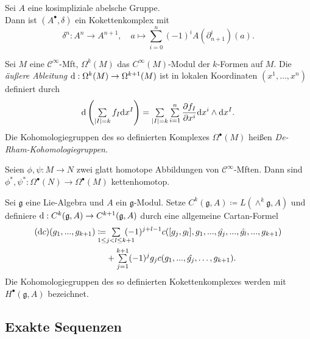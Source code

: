 \documentclass{cheat-sheet}
\newcommand{\nspace}[1]{\foreach \i in {1,...,#1}{ \! }} %
\newcommand{\Lg}{\mathfrak{g}} %
\newcommand{\Cont}{\mathcal{C}} %
\begin{document}
\begin{defn}
  Sei $A$ eine kosimpliziale abelsche Gruppe. \\
  Dann ist $(A^\bullet, \delta)$ ein Kokettenkomplex mit
  \[
    \delta^n : A^n \to A^{n+1}, \quad
    a \mapsto \sum_{i=0}^n (-1)^i A(\partial_{n+1}^i)(a).
  \]
\end{defn}


\begin{defn}
  Sei $M$ eine $\Cont^\infty$-Mft, $\Omega^k(M)$ das $C^\infty(M)$-Modul der $k$-Formen auf $M$. Die \emph{äußere Ableitung} $\mathrm{d} : \Omega^k(M) \to \Omega^{k+1}(M)$ ist in lokalen Koordinaten $(x^1, \ldots, x^n)$ definiert durch
  \[ \d \left( \sum_{\abs{I} = k} f_I \d x^I \right) = \sum_{\abs{I} = k} \sum_{i=1}^n \frac{\partial f_I}{\partial x^i} \d x^i \wedge \d x^I. \]
  Die Kohomologiegruppen des so definierten Komplexes $\Omega^\bullet(M)$ heißen \emph{De-Rham-Kohomologiegruppen}.
\end{defn}

\begin{prop}
  Seien $\phi, \psi : M \to N$ zwei glatt homotope Abbildungen von $\Cont^\infty$-Mften. Dann sind $\phi^*, \psi^* : \Omega^\bullet(N) \to \Omega^\bullet(M)$ kettenhomotop.
\end{prop}


\begin{defn}
  Sei $\Lg$ eine Lie-Algebra und $A$ ein $\Lg$-Modul. Setze $C^k(\Lg, A) \coloneqq L(\wedge^k \Lg, A)$ und definiere $\d : C^k(\Lg, A) \to C^{k+1}(\Lg, A)$ durch eine allgemeine Cartan-Formel
  \begin{align*}
    (\d c)(g_1, \nldots, g_{k+1}) \coloneqq & \nspace{7} \sum_{1 \leq j < l \leq k+1} \nspace{7} (-1)^{j+l-1} c([g_j, g_l], g_1, \nldots, \hat{g_j}, \nldots, \hat{g_l}, \nldots, g_{k+1}) \\
    & + \sum_{j=1}^{k+1} (-1)^j g_j c(g_1, \nldots, \hat{g_j}, \ldots, g_{k+1}).
  \end{align*}
  Die Kohomologiegruppen des so definierten Kokettenkomplexes werden mit $H^\bullet(\Lg, A)$ bezeichnet.
\end{defn}


\subsection{Exakte Sequenzen}
\end{document}
